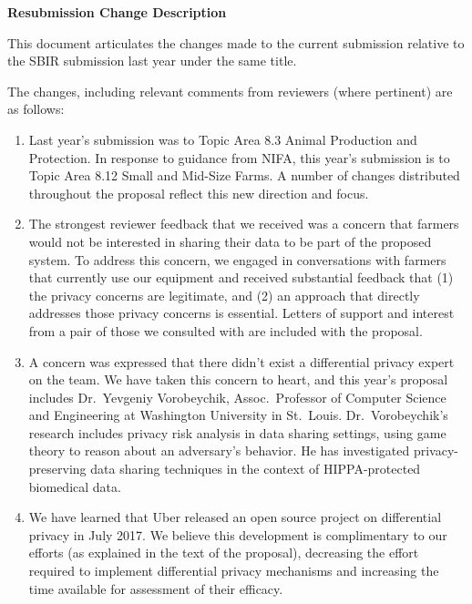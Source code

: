 \documentclass[11pt]{article}
\begin{document}
\pagestyle{plain}
\thispagestyle{plain}

\begin{center}
\textbf{\Large Resubmission Change Description}
\end{center}

This document articulates the changes made to the current submission relative
to the SBIR submission last year under the same title.

The changes, including relevant comments from reviewers (where pertinent)
are as follows:

\begin{enumerate}

\item Last year's submission was to Topic Area 8.3 Animal Production
and Protection.  In response to guidance from NIFA, this year's submission
is to Topic Area 8.12 Small and Mid-Size Farms.  A number of changes
distributed throughout the proposal reflect this new direction and focus.

\item The strongest reviewer feedback that we received was a concern that
farmers would not be interested in sharing their data to be part of the
proposed system.  To address this concern, we engaged in conversations
with farmers that currently use our equipment and received substantial
feedback that (1) the privacy concerns are legitimate, and (2) an
approach that directly addresses those privacy concerns is essential.
Letters of support and interest from a pair of those we consulted with
are included with the proposal.


\item A concern was expressed that
there didn't exist a differential privacy expert on the team.  We have taken
this concern to heart, and this year's proposal includes Dr.~Yevgeniy
Vorobeychik, Assoc.~Professor of Computer Science and Engineering at
Washington University in St.~Louis.  Dr.~Vorobeychik's research includes
privacy risk analysis in data sharing settings, using game theory to
reason about an adversary's behavior.
He has investigated privacy-preserving data sharing techniques
in the context of HIPPA-protected biomedical data.

\item We have learned that Uber released an open source project
on differential privacy in July 2017.
We believe this development is complimentary to our efforts
(as explained in the text of the proposal),
decreasing the effort required to implement differential
privacy mechanisms and increasing the time available for assessment of
their efficacy.


\end{enumerate}
\end{document}
